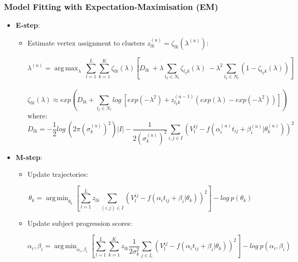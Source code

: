 \documentclass[8pt,xcolor=table]{beamer}
\DeclareMathOperator*{\argmin}{arg\,min}
\DeclareMathOperator*{\argmax}{arg\,max}
\begin{document}
\begin{frame}[label=current]
\frametitle{Model Fitting with Expectation-Maximisation (EM)}


    \vspace{-4em}
    \begin{itemize}
    \item \textbf{E-step}:
    \begin{itemize}
    \item Estimate vertex assignment to clusters $z_{lk}^{(u)} = \zeta_{lk}(\lambda^{(u)})$:
     
    $$ \lambda^{(u)} = \argmax_{\lambda}\ \sum_{l=1}^L \sum_{k=1}^K \zeta_{lk}(\lambda) \left[  D_{lk} \  + \lambda \sum_{l_2 \in N_l}  \zeta_{l_2 k}(\lambda)\  -\lambda^2 \sum_{l_2 \in N_l} (1- \zeta_{l_2 k}(\lambda))  \right]$$\\
    $$    \zeta_{lk}(\lambda) \approx exp \left( D_{lk} +   \sum_{l_2 \in N_l} log\ \left[ exp(-\lambda^2) + z_{l_2k}^{(u-1)} (exp(\lambda) - exp(-\lambda^2)) \right] \right) $$
    where:
    $$ D_{lk} = -\frac{1}{2}log\ (2 \pi \left(\sigma_k^{(u)}\right)^2) |I| - \frac{1}{2\left(\sigma_k^{(u)}\right)^2} \sum_{i,j \in I} (V_l^{ij} - f(\alpha_i^{(u)} t_{ij} + \beta_i^{(u)} | \theta_k^{(u)}))^2$$
        
    \end{itemize}
    \item \textbf{M-step}:
    \begin{itemize}
     \item Update trajectories:
     
     \begin{equation}
 \label{eq:theta}
 \theta_k = \argmin_{\theta_k} \left[\sum_{l=1}^L z_{lk} \sum_{(i,j) \in I} (V_l^{ij} - f(\alpha_i t_{ij} + \beta_i | \theta_k))^2 \right] - log\ p(\theta_k) 
\end{equation}
     
     \item Update subject progression scores:
     
     \begin{equation}
\label{eq:alpha}
 \alpha_i, \beta_i = \argmin_{\alpha_i, \beta_i}  \left[ \sum_{l=1}^L \sum_{k=1}^K z_{lk} \frac{1}{2\sigma_k^2} \sum_{j \in I_i} (V_l^{ij} - f(\alpha_i t_{ij} + \beta_i | \theta_k))^2\right] - log\ p(\alpha_i, \beta_i)
\end{equation}
     
    \end{itemize}
    \end{itemize}
\vspace{-3em}
    
\end{frame}
\end{document}
